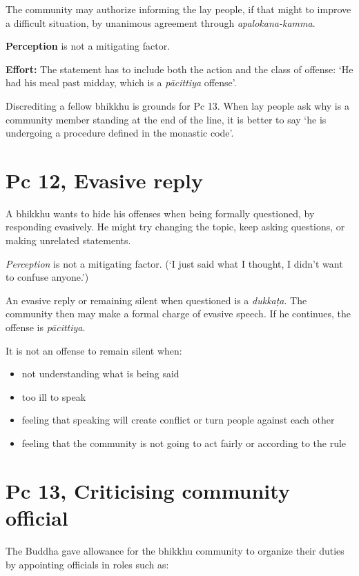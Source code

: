 The community may authorize informing the lay people, if that might to
improve a difficult situation, by unanimous agreement through
\emph{apalokana-kamma}.

\textbf{Perception} is not a mitigating factor.

\textbf{Effort:} The statement has to include both the action and the
class of offense: `He had his meal past midday, which is a
\emph{pācittiya} offense'.

Discrediting a fellow bhikkhu is grounds for Pc 13. When lay people ask
why is a community member standing at the end of the line, it is better
to say `he is undergoing a procedure defined in the monastic code'.

\section{Pc 12, Evasive reply}

A bhikkhu wants to hide his offenses when being formally questioned, by
responding evasively. He might try changing the topic, keep asking
questions, or making unrelated statements.

\emph{Perception} is not a mitigating factor. (`I just said what I
thought, I didn't want to confuse anyone.')

An evasive reply or remaining silent when questioned is a
\emph{dukkaṭa}. The community then may make a formal charge of evasive
speech. If he continues, the offense is \emph{pācittiya}.

It is not an offense to remain silent when:

\begin{itemize}
\tightlist
\item
  not understanding what is being said
\item
  too ill to speak
\item
  feeling that speaking will create conflict or turn people against each
  other
\item
  feeling that the community is not going to act fairly or according to
  the rule
\end{itemize}

\section{Pc 13, Criticising community official}

The Buddha gave allowance for the bhikkhu community to organize their
duties by appointing officials in roles such as:

